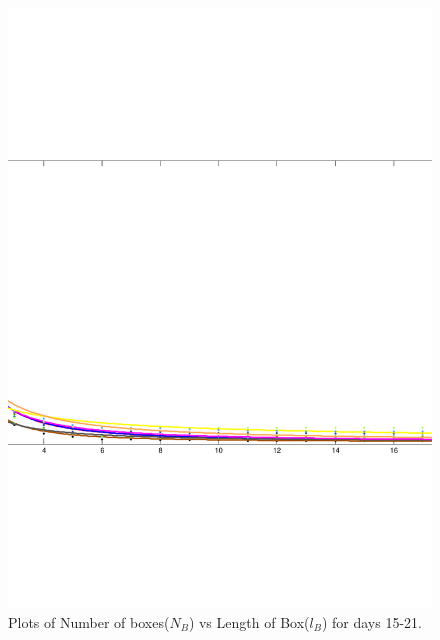 \documentclass{article}
\begin{document}
\begin{figure}
\centering
\includegraphics[scale=0.3]{plot3/plot3}
\caption{Plots of Number of boxes($N_B$) vs Length of Box($l_B$) for days 15-21.}
\end{figure}
\end{document}
